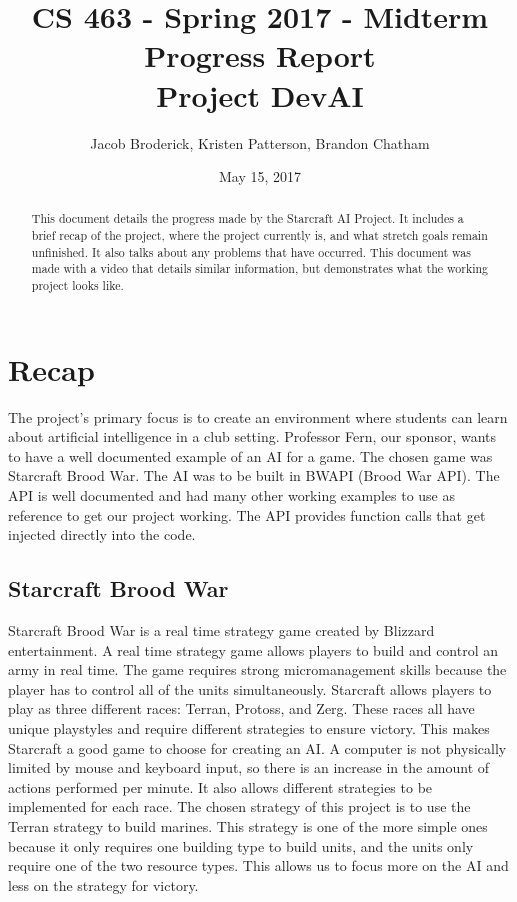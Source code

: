 \documentclass[10pt,letterpaper,onecolumn,draftclsnofoot]{IEEEtran}
\begin{document}
	
	\begin{titlepage}
		
		\title{CS 463 - Spring 2017 - Midterm Progress Report \\ Project DevAI}
		\author{Jacob Broderick, Kristen Patterson, Brandon Chatham}
		\date{May 15, 2017}
		\maketitle
		\vspace{4cm}
		\begin{abstract}
			This document details the progress made by the Starcraft AI Project. It includes a brief recap of the project, where the project currently is, and what stretch goals remain unfinished. It also talks about any problems that have occurred. This document was made with a video that details similar information, but demonstrates what the working project looks like.
		\end{abstract}
	\end{titlepage}

\section{Recap}
The project's primary focus is to create an environment where students can learn about artificial intelligence in a club setting. Professor Fern, our sponsor, wants to have a well documented example of an AI for a game. The chosen game was Starcraft Brood War. The AI was to be built in BWAPI (Brood War API). The API is well documented and had many other working examples to use as reference to get our project working. The API provides function calls that get injected directly into the code.

\subsection{Starcraft Brood War}
Starcraft Brood War is a real time strategy game created by Blizzard entertainment. A real time strategy game allows players to build and control an army in real time. The game requires strong micromanagement skills because the player has to control all of the units simultaneously. Starcraft allows players to play as three different races: Terran, Protoss, and Zerg. These races all have unique playstyles and require different strategies to ensure victory. This makes Starcraft a good game to choose for creating an AI. A computer is not physically limited by mouse and keyboard input, so there is an increase in the amount of actions performed per minute. It also allows different strategies to be implemented for each race. The chosen strategy of this project is to use the Terran strategy to build marines. This strategy is one of the more simple ones because it only requires one building type to build units, and the units only require one of the two resource types. This allows us to focus more on the AI and less on the strategy for victory.
\end{document}
